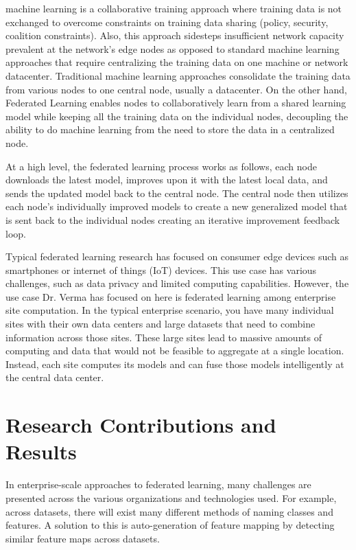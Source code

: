 \documentclass[journal,onecolumn]{IEEEtran}
\begin{document}
 machine learning is a collaborative training approach where training data is not exchanged to overcome constraints on training data sharing (policy, security, coalition constraints). Also, this approach sidesteps insufficient network capacity prevalent at the network's edge nodes as opposed to standard machine learning approaches that require centralizing the training data on one machine or network datacenter. Traditional machine learning approaches consolidate the training data from various nodes to one central node, usually a datacenter. On the other hand, Federated Learning enables nodes to collaboratively learn from a shared learning model while keeping all the training data on the individual nodes, decoupling the ability to do machine learning from the need to store the data in a centralized node. 

At a high level, the federated learning process works as follows, each node downloads the latest model, improves upon it with the latest local data, and sends the updated model back to the central node. The central node then utilizes each node's individually improved models to create a new generalized model that is sent back to the individual nodes creating an iterative improvement feedback loop.

Typical federated learning research has focused on consumer edge devices such as smartphones or internet of things (IoT) devices. This use case has various challenges, such as data privacy and limited computing capabilities. However, the use case Dr. Verma has focused on here is federated learning among enterprise site computation. In the typical enterprise scenario, you have many individual sites with their own data centers and large datasets that need to combine information across those sites. These large sites lead to massive amounts of computing and data that would not be feasible to aggregate at a single location. Instead, each site computes its models and can fuse those models intelligently at the central data center. 

\section{Research Contributions and Results}

In enterprise-scale approaches to federated learning, many challenges are presented across the various organizations and technologies used. For example, across datasets, there will exist many different methods of naming classes and features. A solution to this is auto-generation of feature mapping by detecting similar feature maps across datasets. 
\end{document}
